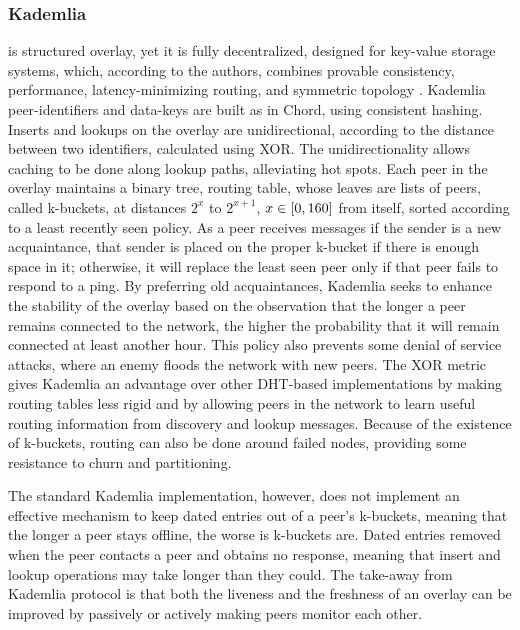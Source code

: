 \documentclass[runningheads]{llncs}
\begin{document}
\subsubsection{Kademlia} \cite{kademlia} is structured overlay, yet it is fully decentralized, designed for key-value storage systems, which, according to the authors, combines provable consistency, performance, latency-minimizing routing, and symmetric topology \cite{kademlia}. Kademlia peer-identifiers and data-keys are built as in Chord\cite{chord}, using consistent hashing. Inserts and lookups on the overlay are unidirectional, according to the distance between two identifiers, calculated using XOR. The unidirectionality allows caching to be done along lookup paths, alleviating hot spots. Each peer in the overlay maintains a binary tree, routing table, whose leaves are lists of peers, called k-buckets, at distances $2^{x}$ to $2^{x+1}$, $x \in\hspace{1mm}\mathclose[0,160\mathclose]$ from itself, sorted according to a least recently seen policy. As a peer receives messages if the sender is a new acquaintance, that sender is placed on the proper k-bucket if there is enough space in it; otherwise, it will replace the least seen peer only if that peer fails to respond to a ping. By preferring old acquaintances, Kademlia seeks to enhance the stability of the overlay based on the observation that the longer a peer remains connected to the network, the higher the probability that it will remain connected at least another hour\cite{ssaroiu:msp2pfss}. This policy also prevents some denial of service attacks, where an enemy floods the network with new peers. The XOR metric gives Kademlia an advantage over other DHT-based implementations by making routing tables less rigid and by allowing peers in the network to learn useful routing information from discovery and lookup messages. Because of the existence of k-buckets, routing can also be done around failed nodes, providing some resistance to churn and partitioning.

The standard Kademlia implementation, however, does not implement an effective mechanism to keep dated entries out of a peer's k-buckets, meaning that the longer a peer stays offline, the worse is k-buckets are. Dated entries removed when the peer contacts a peer and obtains no response, meaning that insert and lookup operations may take longer than they could. The take-away from Kademlia protocol is that both the liveness and the freshness of an overlay can be improved by passively or actively making peers monitor each other.\newline
\end{document}
